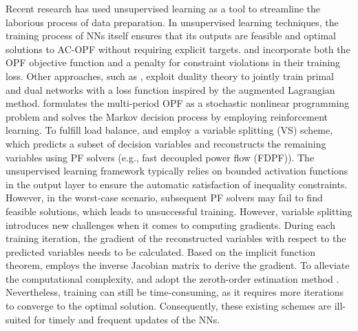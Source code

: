 Recent research has used unsupervised learning as a tool to streamline the laborious process of data preparation. In unsupervised learning techniques, the training process of NNs itself ensures that its outputs are feasible and optimal solutions to AC-OPF without requiring explicit targets. \cite{huang2021} and \cite{Junfei2022} incorporate both the OPF objective function and a penalty for constraint violations in their training loss. Other approaches, such as \cite{parkaaai}, exploit duality theory to jointly train primal and dual networks with a loss function inspired by the augmented Lagrangian method. \cite{Cao} formulates the multi-period OPF as a stochastic nonlinear programming problem and solves the Markov decision process by employing reinforcement learning. To fulfill load balance, \cite{donti2021dc3} and \cite{KejunGlobal} employ a variable splitting (VS) scheme, which predicts a subset of decision variables and reconstructs the remaining variables using PF solvers (e.g., fast decoupled power flow (FDPF)). The unsupervised learning framework typically relies on bounded activation functions in the output layer to ensure the automatic satisfaction of inequality constraints. However, in the worst-case scenario, subsequent PF solvers may fail to find feasible solutions, which leads to unsuccessful training. However, variable splitting introduces new challenges when it comes to computing gradients. During each training iteration, the gradient of the reconstructed variables with respect to the predicted variables needs to be calculated. Based on the implicit function theorem, \cite{donti2021dc3} employs the inverse Jacobian matrix to derive the gradient. To alleviate the computational complexity, \cite{deepopf} and \cite{WANG2022} adopt the zeroth-order estimation method \cite{Liu2020}. Nevertheless, training can still be time-consuming, as it requires more iterations to converge to the optimal solution. Consequently, these existing schemes are ill-suited for timely and frequent updates of the NNs.